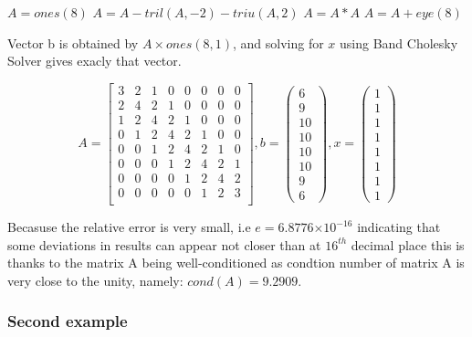 \documentclass{article}
\providecommand{\e}[1]{\ensuremath{\times 10^{#1}}}
\begin{document}
\begin{algorithmic}
\STATE $A = ones(8)$
\STATE $A = A-tril(A,-2)-triu(A,2)$
\STATE $A = A*A$
\STATE $A = A+eye(8)$
\end{algorithmic}

Vector b is obtained by $A \times ones(8, 1)$, and solving for $x$ using Band
Cholesky Solver gives exacly that vector.

\[ A = \left[
\begin{array}{cccccccc}
3 & 2 & 1 & 0 & 0 & 0 & 0 & 0 \\
2 & 4 & 2 & 1 & 0 & 0 & 0 & 0 \\
1 & 2 & 4 & 2 & 1 & 0 & 0 & 0 \\
0 & 1 & 2 & 4 & 2 & 1 & 0 & 0 \\
0 & 0 & 1 & 2 & 4 & 2 & 1 & 0 \\
0 & 0 & 0 & 1 & 2 & 4 & 2 & 1 \\
0 & 0 & 0 & 0 & 1 & 2 & 4 & 2 \\
0 & 0 & 0 & 0 & 0 & 1 & 2 & 3 \\
\end{array} \right], 
b = \left( \begin{array}{c} 
6 \\ 9 \\ 10 \\ 10 \\ 10 \\ 10 \\ 9 \\ 6
\end{array} \right), 
x = \left( \begin{array}{c} 
1\\ 1\\ 1\\ 1\\ 1\\ 1\\ 1\\ 1
\end{array} \right)
\]

Becasuse the relative error is very small, i.e $e =  6.8776\e{-16}$ indicating
that some deviations in results can appear not closer than at $16^{th}$ decimal
place this is thanks to the matrix A being well-conditioned as condtion number 
of matrix A is very close to the unity, namely: $cond(A) = 9.2909$.

\subsubsection{Second example}
\end{document}
